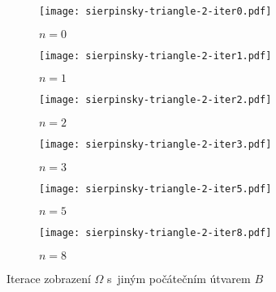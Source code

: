 \begin{figure}[H]
    \centering
    \begin{subfigure}{0.45\textwidth}
        \centering
        \texttt{[image: sierpinsky-triangle-2-iter0.pdf]}
        \begin{center}
            $n=0$
        \end{center}
    \end{subfigure}
    \qquad
    \vspace{1cm}
    \begin{subfigure}{0.45\textwidth}
        \centering
        \texttt{[image: sierpinsky-triangle-2-iter1.pdf]}
        \begin{center}
            $n=1$
        \end{center}
    \end{subfigure}
    \qquad
    \begin{subfigure}{0.45\textwidth}
        \centering
        \texttt{[image: sierpinsky-triangle-2-iter2.pdf]}
        \begin{center}
            $n=2$
        \end{center}
    \end{subfigure}
    \qquad
    \vspace{1cm}
    \begin{subfigure}{0.45\textwidth}
        \centering
        \texttt{[image: sierpinsky-triangle-2-iter3.pdf]}
        \begin{center}
            $n=3$
        \end{center}
    \end{subfigure}
    \qquad
    \begin{subfigure}{0.45\textwidth}
        \centering
        \texttt{[image: sierpinsky-triangle-2-iter5.pdf]}
        \begin{center}
            $n=5$
        \end{center}
    \end{subfigure}
    \qquad
    \begin{subfigure}{0.45\textwidth}
        \centering
        \texttt{[image: sierpinsky-triangle-2-iter8.pdf]}
        \begin{center}
            $n=8$
        \end{center}
    \end{subfigure}
    \caption{Iterace zobrazení $\Omega$ s~jiným počátečním útvarem $B$}
    \label{fig:iterace-zobrazeni-omega-sierpinskeho-trojuhelnik-jiny-poc-utvar}
\end{figure}
